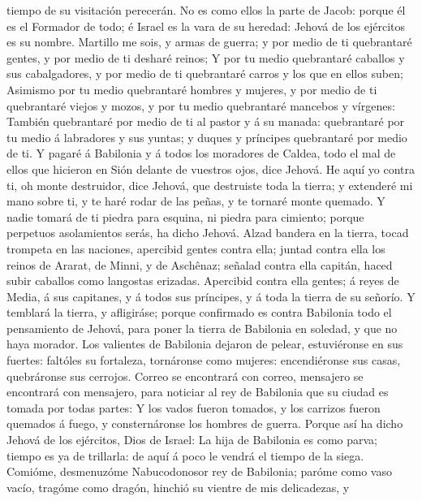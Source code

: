 tiempo de su visitación perecerán.  No es como ellos la
parte de Jacob: porque él es el Formador de todo; é Israel es la vara de
su heredad: Jehová de los ejércitos es su nombre.  Martillo
me sois, y armas de guerra; y por medio de ti quebrantaré gentes, y por
medio de ti desharé reinos;  Y por tu medio quebrantaré
caballos y sus cabalgadores, y por medio de ti quebrantaré carros y los
que en ellos suben;  Asimismo por tu medio quebrantaré
hombres y mujeres, y por medio de ti quebrantaré viejos y mozos, y por
tu medio quebrantaré mancebos y vírgenes:  También
quebrantaré por medio de ti al pastor y á su manada: quebrantaré por tu
medio á labradores y sus yuntas; y duques y príncipes quebrantaré por
medio de ti.  Y pagaré á Babilonia y á todos los moradores
de Caldea, todo el mal de ellos que hicieron en Sión delante de vuestros
ojos, dice Jehová.  He aquí yo contra ti, oh monte
destruidor, dice Jehová, que destruiste toda la tierra; y extenderé mi
mano sobre ti, y te haré rodar de las peñas, y te tornaré monte quemado.
 Y nadie tomará de ti piedra para esquina, ni piedra para
cimiento; porque perpetuos asolamientos serás, ha dicho Jehová.
 Alzad bandera en la tierra, tocad trompeta en las
naciones, apercibid gentes contra ella; juntad contra ella los reinos de
Ararat, de Minni, y de Aschênaz; señalad contra ella capitán, haced
subir caballos como langostas erizadas.  Apercibid contra
ella gentes; á reyes de Media, á sus capitanes, y á todos sus príncipes,
y á toda la tierra de su señorío.  Y temblará la tierra, y
afligiráse; porque confirmado es contra Babilonia todo el pensamiento de
Jehová, para poner la tierra de Babilonia en soledad, y que no haya
morador.  Los valientes de Babilonia dejaron de pelear,
estuviéronse en sus fuertes: faltóles su fortaleza, tornáronse como
mujeres: encendiéronse sus casas, quebráronse sus cerrojos.
 Correo se encontrará con correo, mensajero se encontrará
con mensajero, para noticiar al rey de Babilonia que su ciudad es tomada
por todas partes:  Y los vados fueron tomados, y los
carrizos fueron quemados á fuego, y consternáronse los hombres de
guerra.  Porque así ha dicho Jehová de los ejércitos, Dios
de Israel: La hija de Babilonia es como parva; tiempo es ya de
trillarla: de aquí á poco le vendrá el tiempo de la siega. 
Comióme, desmenuzóme Nabucodonosor rey de Babilonia; paróme como vaso
vacío, tragóme como dragón, hinchió su vientre de mis delicadezas, y
